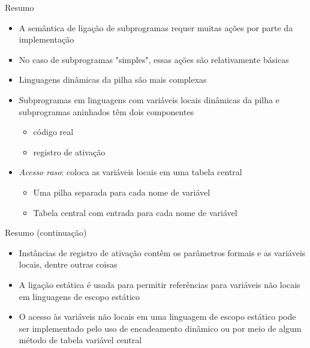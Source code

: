 \documentclass[10pt]{beamer}
\begin{document}
\begin{frame}{Resumo}
\begin{itemize}
	\item A semântica de ligação de subprogramas requer muitas ações por parte da implementação
	\item No caso de subprogramas "simples", essas ações são relativamente básicas
	\item Linguagens dinâmicas da pilha são mais complexas
	\item Subprogramas em linguagens com variáveis locais dinâmicas da pilha e subprogramas aninhados têm dois componentes
	\begin{itemize}
        \item código real
        \item registro de ativação
    \end{itemize}
    \item \textit{Acesso raso}: coloca as variáveis locais em uma tabela central
    \begin{itemize}
        \item Uma pilha separada para cada nome de variável
        \item Tabela central com entrada para cada nome de variável
    \end{itemize}
\end{itemize}

\end{frame}

\begin{frame}{Resumo (continuação)}
\begin{itemize}
	\item Instâncias de registro de ativação contêm os parâmetros formais e as variáveis locais, dentre outras coisas
	\item A ligação estática é usada para permitir referências para variáveis não locais em linguagens de escopo estático
	\item O acesso às variáveis não locais em uma linguagem de escopo estático pode ser implementado pelo uso de encadeamento dinâmico ou por meio de algum método de tabela variável central
\end{itemize}

\end{frame}
\end{document}
